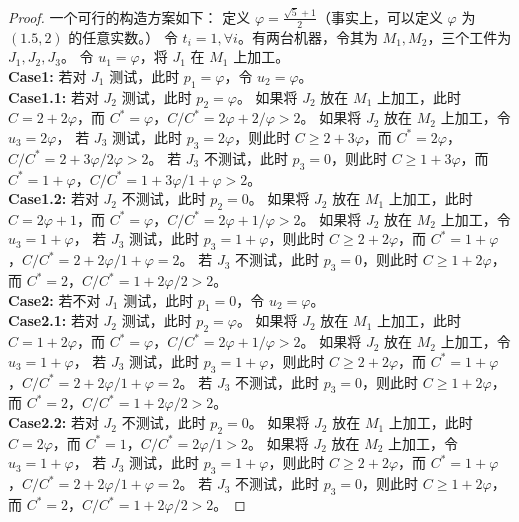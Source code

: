 \begin{proof}
一个可行的构造方案如下：
定义 $\varphi = \frac{\sqrt{5} + 1}{2}$（事实上，可以定义 $\varphi$ 为 $(1.5, 2)$ 的任意实数。）
令 \(t_i = 1, \forall i\)。有两台机器，令其为 $M_1,M_2$，三个工件为 $J_1,J_2,J_3$。
令 $u_1 = \varphi$，将 $J_1$ 在 $M_1$ 上加工。
\\
\textbf{Case1: }
若对 $J_1$ 测试，此时 $p_1=\varphi$，令 $u_2 = \varphi$。
\\
\textbf{Case1.1: }
若对 $J_2$ 测试，此时 $p_2=\varphi$。
如果将 $J_2$ 放在 $M_1$ 上加工，此时 $C = 2+2\varphi$，而 $C^* = \varphi$，$C/C^* = 2\varphi + 2 / \varphi > 2$。
如果将 $J_2$ 放在 $M_2$ 上加工，令 $u_3 = 2\varphi$，
若 $J_3$ 测试，此时 $p_3 = 2\varphi$，则此时 $C \geq 2+3\varphi$，而 $C^* = 2\varphi$，$C/C^* = 2+3\varphi / 2\varphi > 2$。
若 $J_3$ 不测试，此时 $p_3 = 0$，则此时 $C \geq 1+3\varphi$，而 $C^* = 1 + \varphi$，$C/C^* = 1+3\varphi / 1 + \varphi > 2$。
\\
\textbf{Case1.2: }
若对 $J_2$ 不测试，此时 $p_2=0$。
如果将 $J_2$ 放在 $M_1$ 上加工，此时 $C = 2\varphi + 1$，而 $C^* = \varphi$，$C/C^* = 2\varphi + 1 / \varphi > 2$。
如果将 $J_2$ 放在 $M_2$ 上加工，令 $u_3 = 1 + \varphi$，
若 $J_3$ 测试，此时 $p_3 = 1 + \varphi$，则此时 $C \geq 2+2\varphi$，而 $C^* = 1 + \varphi$，$C/C^* = 2+2\varphi / 1 + \varphi = 2$。
若 $J_3$ 不测试，此时 $p_3 = 0$，则此时 $C \geq 1+2\varphi$，而 $C^* = 2$，$C/C^* = 1+2\varphi / 2 > 2$。
\\
\textbf{Case2: }
若不对 $J_1$ 测试，此时 $p_1 = 0$，令 $u_2 = \varphi$。
\\
\textbf{Case2.1: }
若对 $J_2$ 测试，此时 $p_2=\varphi$。
如果将 $J_2$ 放在 $M_1$ 上加工，此时 $C = 1+2\varphi$，而 $C^* = \varphi$，$C/C^* = 2\varphi + 1 / \varphi > 2$。
如果将 $J_2$ 放在 $M_2$ 上加工，令 $u_3 = 1+\varphi$，
若 $J_3$ 测试，此时 $p_3 = 1+\varphi$，则此时 $C \geq 2+2\varphi$，而 $C^* = 1+\varphi$，$C/C^* = 2+2\varphi / 1+\varphi = 2$。
若 $J_3$ 不测试，此时 $p_3 = 0$，则此时 $C \geq 1+2\varphi$，而 $C^* = 2$，$C/C^* = 1+2\varphi / 2 > 2$。
\\
\textbf{Case2.2: }
若对 $J_2$ 不测试，此时 $p_2=0$。
如果将 $J_2$ 放在 $M_1$ 上加工，此时 $C = 2\varphi$，而 $C^* = 1$，$C/C^* = 2\varphi/ 1> 2$。
如果将 $J_2$ 放在 $M_2$ 上加工，令 $u_3 = 1 + \varphi$，
若 $J_3$ 测试，此时 $p_3 = 1 + \varphi$，则此时 $C \geq 2+2\varphi$，而 $C^* = 1 + \varphi$，$C/C^* = 2+2\varphi / 1 + \varphi = 2$。
若 $J_3$ 不测试，此时 $p_3 = 0$，则此时 $C \geq 1+2\varphi$，而 $C^* = 2$，$C/C^* = 1+2\varphi / 2 > 2$。


\end{proof}

